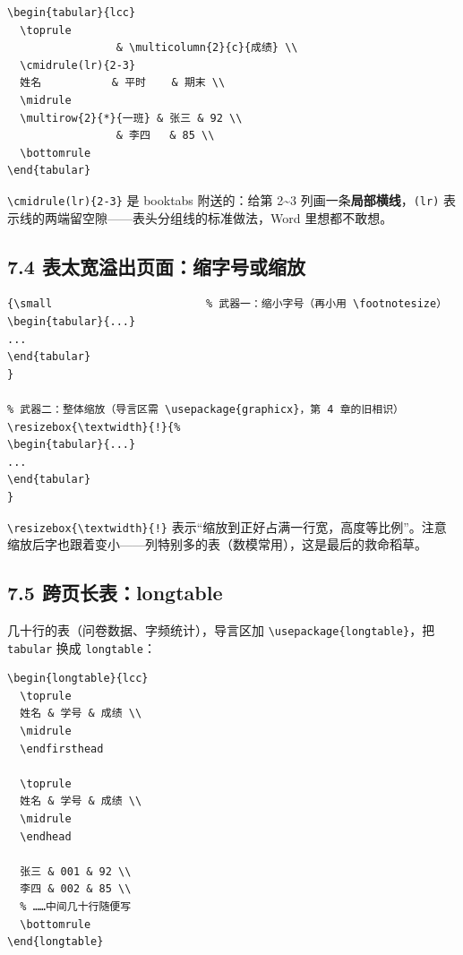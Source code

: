 \begin{lstlisting}
\begin{tabular}{lcc}
  \toprule
                 & \multicolumn{2}{c}{成绩} \\
  \cmidrule(lr){2-3}
  姓名           & 平时    & 期末 \\
  \midrule
  \multirow{2}{*}{一班} & 张三 & 92 \\
                 & 李四   & 85 \\
  \bottomrule
\end{tabular}
\end{lstlisting}

\texttt{\textbackslash{}cmidrule(lr)\{2-3\}} 是 booktabs 附送的：给第 2\textasciitilde{}3 列画一条\textbf{局部横线}，\texttt{(lr)} 表示线的两端留空隙——表头分组线的标准做法，Word 里想都不敢想。

\subsection*{7.4 表太宽溢出页面：缩字号或缩放}

\begin{lstlisting}
{\small                        % 武器一：缩小字号（再小用 \footnotesize）
\begin{tabular}{...}
...
\end{tabular}
}

% 武器二：整体缩放（导言区需 \usepackage{graphicx}，第 4 章的旧相识）
\resizebox{\textwidth}{!}{%
\begin{tabular}{...}
...
\end{tabular}
}
\end{lstlisting}

\texttt{\textbackslash{}resizebox\{\textbackslash{}textwidth\}\{!\}} 表示“缩放到正好占满一行宽，高度等比例”。注意缩放后字也跟着变小——列特别多的表（数模常用），这是最后的救命稻草。

\subsection*{7.5 跨页长表：longtable}

几十行的表（问卷数据、字频统计），导言区加 \texttt{\textbackslash{}usepackage\{longtable\}}，把 \texttt{tabular} 换成 \texttt{longtable}：

\begin{lstlisting}
\begin{longtable}{lcc}
  \toprule
  姓名 & 学号 & 成绩 \\
  \midrule
  \endfirsthead

  \toprule
  姓名 & 学号 & 成绩 \\
  \midrule
  \endhead

  张三 & 001 & 92 \\
  李四 & 002 & 85 \\
  % ……中间几十行随便写
  \bottomrule
\end{longtable}
\end{lstlisting}

